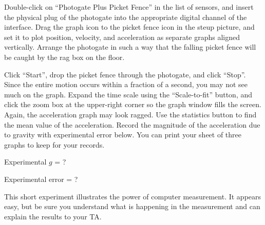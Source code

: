\documentclass{article}
\begin{document}
Double-click on ``Photogate Plus Picket Fence'' in the list of sensors, and insert the physical plug of the photogate into the appropriate digital channel of the interface.  Drag the graph icon to the picket fence icon in the steup picture, and set it to plot position, velocity, and acceleration as separate graphs aligned vertically.  Arrange the photogate in such a way that the falling picket fence will be caught by the rag box on the floor.

Click ``Start'', drop the picket fence through the photogate, and click ``Stop''.  Since the entire motion occurs within a fraction of a second, you may not see much on the graph.  Expand the time scale using the ``Scale-to-fit'' button, and click the zoom box at the upper-right corner so the graph window fills the screen.  Again, the acceleration graph may look ragged.  Use the statistics button to find the mean value of the acceleration.  Record the magnitude of the acceleration due to gravity with experimental error below.  You can print your sheet of three graphs to keep for your records.

Experimental \(g\) = ?

Experimental error = ?

This short experiment illustrates the power of computer measurement.  It appears easy, but be sure you understand what is happening in the measurement and can explain the results to your TA.
\end{document}
